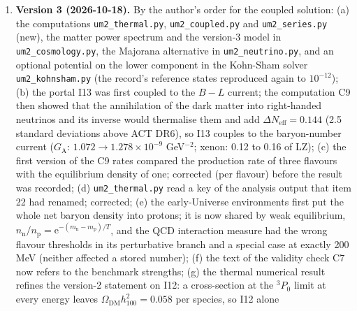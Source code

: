\documentclass[
  10pt,
]{article}
\begin{document}
\begin{enumerate}
  (\((17.6\ \text{TeV})^{-3}\) with \(g_\rho = 105.75\), not a version-1
  value); further notational clashes added to the symbol lists; (h)
  self-containment: equations and inputs used but not written in a
  document (the relic and \(\Delta N_{\mathrm{eff}}\) formulas, the
  Einstein-Boltzmann equations, the BAO goodness of fit and data, the
  nonlinear background equations, the fermion equations with their
  boundary conditions, the decoupling equations, the CNB, Landau-Zener,
  adiabatic solar, condensate and pairing formulas, the Kohn-Sham
  equations behind the quoted equations of state) are now written out in
  every document that uses them.
\item
  \textbf{Version 3 (2026-10-18).} By the author's order for the coupled
  solution: (a) the computations \texttt{um2\_thermal.py},
  \texttt{um2\_coupled.py} and \texttt{um2\_series.py} (new), the matter
  power spectrum and the version-3 model in \texttt{um2\_cosmology.py},
  the Majorana alternative in \texttt{um2\_neutrino.py}, and an optional
  potential on the lower component in the Kohn-Sham solver
  \texttt{um2\_kohnsham.py} (the record's reference states reproduced
  again to \(10^{-12}\)); (b) the portal I13 was first coupled to the
  \(B - L\) current; the computation C9 then showed that the
  annihilation of the dark matter into right-handed neutrinos and its
  inverse would thermalise them and add
  \(\Delta N_{\mathrm{eff}} = 0.144\) (2.5 standard deviations above ACT
  DR6), so I13 couples to the baryon-number current (\(G_{\mathrm{A}}\):
  \(1.072 \to 1.278\times10^{-9}\) GeV\(^{-2}\); xenon: 0.12 to 0.16 of
  LZ); (c) the first version of the C9 rates compared the production
  rate of three flavours with the equilibrium density of one; corrected
  (per flavour) before the result was recorded; (d)
  \texttt{um2\_thermal.py} read a key of the analysis output that item
  22 had renamed; corrected; (e) the early-Universe environments first
  put the whole net baryon density into protons; it is now shared by
  weak equilibrium,
  \(n_{\mathrm{n}}/n_{\mathrm{p}} = \mathrm{e}^{-(m_{\mathrm{n}} - m_{\mathrm{p}})/T}\),
  and the QCD interaction measure had the wrong flavour thresholds in
  its perturbative branch and a special case at exactly 200 MeV (neither
  affected a stored number); (f) the text of the validity check C7 now
  refers to the benchmark strengths; (g) the thermal numerical result
  refines the version-2 statement on I12: a cross-section at the
  \(^3P_0\) limit at every energy leaves
  \(\Omega_{\mathrm{DM}}h_{100}^2 = 0.058\) per species, so I12 alone

\end{enumerate}
\end{document}
